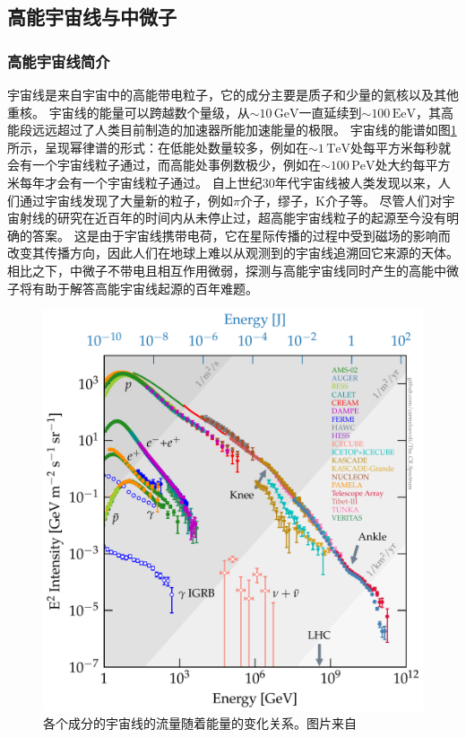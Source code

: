 \subsection{高能宇宙线与中微子}

\subsubsection{高能宇宙线简介}

宇宙线是来自宇宙中的高能带电粒子，它的成分主要是质子和少量的氦核以及其他重核\cite{Gaisser:2016}。
宇宙线的能量可以跨越数个量级，从$\sim 10 \,\mathrm{GeV}$一直延续到$\sim 100 \,\mathrm{EeV}$，其高能段远远超过了人类目前制造的加速器所能加速能量的极限。
宇宙线的能谱如图\ref{fig:CR_spectrum}所示，呈现幂律谱的形式：在低能处数量较多，例如在$\sim 1 \,\mathrm{TeV}$处每平方米每秒就会有一个宇宙线粒子通过，而高能处事例数极少，例如在$\sim 100 \,\mathrm{PeV}$处大约每平方米每年才会有一个宇宙线粒子通过。
自上世纪30年代宇宙线被人类发现以来，人们通过宇宙线发现了大量新的粒子，例如$\pi$介子，缪子，K介子等。
尽管人们对宇宙射线的研究在近百年的时间内从未停止过，超高能宇宙线粒子的起源至今没有明确的答案。
这是由于宇宙线携带电荷，它在星际传播的过程中受到磁场的影响而改变其传播方向，因此人们在地球上难以从观测到的宇宙线追溯回它来源的天体。
相比之下，中微子不带电且相互作用微弱，探测与高能宇宙线同时产生的高能中微子将有助于解答高能宇宙线起源的百年难题。

\begin{figure}[htb]
    \centering
    \includegraphics[width=0.8\linewidth]{img/cosmic_ray_spectrum.pdf}
    \caption{各个成分的宇宙线的流量随着能量的变化关系。图片来自\cite{CR_spectrum:2022}}
    \label{fig:CR_spectrum}
\end{figure}

